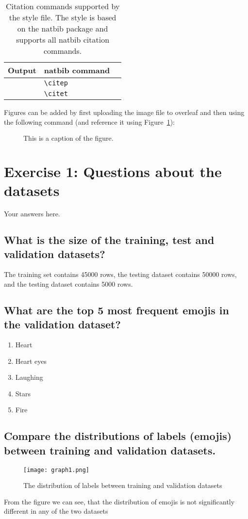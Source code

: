 \documentclass[11pt]{article}
\begin{document}
\begin{table}
  \centering
  \begin{tabular}{lll}
    \hline
    \textbf{Output}           & \textbf{natbib command} \\
    \hline
    \citep{Gusfield:97}       & \verb|\citep|           \\
    \citet{Gusfield:97}       & \verb|\citet|           \\
    \hline
  \end{tabular}
  \caption{\label{citation-guide}
    Citation commands supported by the style file.
    The style is based on the natbib package and supports all natbib citation commands.
  }
  \label{tab:citations}
\end{table}

Figures can be added by first uploading the image file to overleaf and then using the following command (and reference it using Figure~\ref{fig:zipf}):
\begin{figure}[t]

  \caption{This is a caption of the figure.}
  \label{fig:zipf}
\end{figure}

\section{Exercise 1: Questions about the datasets}

Your answers here.

\subsection{What is the size of the training, test and validation datasets?}
The training set contains 45000 rows, the testing dataset contains 50000 rows, and the testing dataset contains 5000 rows. 

\subsection{What are the top 5 most frequent emojis in the validation dataset?}
\begin{enumerate}
	\item Heart
	\item Heart eyes
	\item Laughing 
	\item Stars 
	\item Fire 
\end{enumerate}
 \subsection{Compare the distributions of labels (emojis) between training and validation datasets.}
\begin{figure}[h]
	\texttt{[image: graph1.png]}
	\caption{The distribution of labels between training and validation datasets}
\end{figure}
From the figure we can see, that the distribution of emojis is not significantly different in any of the two datasets
\end{document}
